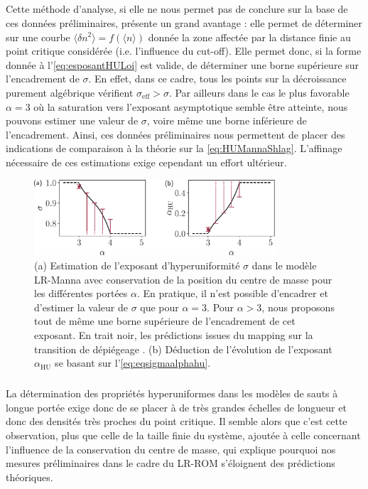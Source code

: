 \subparagraph{}Cette méthode d'analyse, si elle ne nous permet pas de conclure sur la base de ces données préliminaires, présente un grand avantage : elle permet de déterminer sur une courbe $\langle  \delta n^2 \rangle  = f(\langle n \rangle )$ donnée la zone affectée par la distance finie au point critique considérée (i.e. l'influence du cut-off). Elle permet donc, si la forme donnée à l'\autoref{eq:esposantHULoi} est valide, de déterminer une borne supérieure sur l'encadrement de $\sigma$. En effet, dans ce cadre, tous les points sur la décroissance purement algébrique vérifient $\sigma_\text{eff}>\sigma$. Par ailleurs dans le cas le plus favorable $\alpha=3$ où la saturation vers l'exposant asymptotique semble être atteinte, nous pouvons estimer une valeur de $\sigma$, voire même une borne inférieure de l'encadrement. Ainsi, ces données préliminaires nous permettent de placer des indications de comparaison à la théorie sur la \autoref{eq:HUMannaShlag}. L'affinage nécessaire de ces estimations exige cependant un effort ultérieur.

\begin{figure}[h]
\centering
\includegraphics[width=0.8\textwidth]{Chapitre2/Figures/Hyperuniformity/eta_alpha_jumpsManna.pdf}
\caption{(a) Estimation de l'exposant d'hyperuniformité $\sigma$ dans le modèle LR-Manna avec conservation de la position du centre de masse pour les différentes portées $\alpha$. En pratique, il n'est possible d'encadrer et d'estimer la valeur de $\sigma$ que pour $\alpha=3$. Pour $\alpha>3$, nous proposons tout de même une borne supérieure de l'encadrement de cet exposant. En trait noir, les prédictions issues du mapping sur la transition de dépiégeage \cite{wiese_longrange}. (b) Déduction de l'évolution de l'exposant $\alpha_\text{HU}$ se basant sur l'\autoref{eq:eqsigmaalphahu}.}
\label{eq:HUMannaShlag}
\end{figure}

\subparagraph{}La détermination des propriétés hyperuniformes dans les modèles de sauts à longue portée exige donc de se placer à de très grandes échelles de longueur et donc des densités très proches du point critique. Il semble alors que c'est cette observation, plus que celle de la taille finie du système, ajoutée à celle concernant l'influence de la conservation du centre de masse, qui explique pourquoi nos mesures préliminaires dans le cadre du LR-ROM s'éloignent des prédictions théoriques. 

